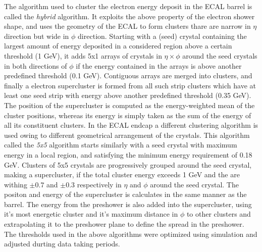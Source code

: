 The algorithm used to cluster the electron energy deposit in the ECAL barrel is called the \textit{hybrid} algorithm. It exploits the above property of the electron shower shape, and uses the geometry of the ECAL to form clusters thare are narrow in $\eta$ direction but wide in $\phi$ direction. Starting with a (seed) crystal containing the largest amount of energy deposited in a considered region above a certain threshold (1 GeV), it adds 5x1 arrays of crystals in $\eta\times\phi$ around the seed crystals in both directions of $\phi$ if the energy contained in the arrays is above another predefined threshold (0.1 GeV). Contiguous arrays are merged into clusters, and finally a electron supercluster is formed from all such strip clusters which have at least one seed strip with energy above another predefined threshold (0.35 GeV). The position of the supercluster is computed as the energy-weighted mean of the cluster positions, whereas its energy is simply taken as the sum of the energy of all its constituent clusters. In the ECAL endcap a different clustering algorithm is used owing to different geometrical arrangement of the crystals. This algorithm called the \textit{5x5} algorithm starts similarly with a seed crystal with maximum energy in a local region, and satisfying the minimum energy requirement of 0.18 GeV. Clusters of 5x5 crystals are progressively grouped around the seed crystal, making a supercluster, if the total cluster energy exceeds 1 GeV and the are withing $\pm 0.7$  and $\pm 0.3$ respectively in $\eta$ and $\phi$ around the seed crystal. The positon and energy of the supercluster is calculates in the same manner as the barrel. The energy from the preshower is also added into the supercluster, using it's most energetic cluster and it's maximum distance in $\phi$ to other clusters and extrapolating it to the preshower plane to define the spread in the preshower. The thresholds used in the above algorithms were optimized using simulation and adjusted durting data taking periods.

